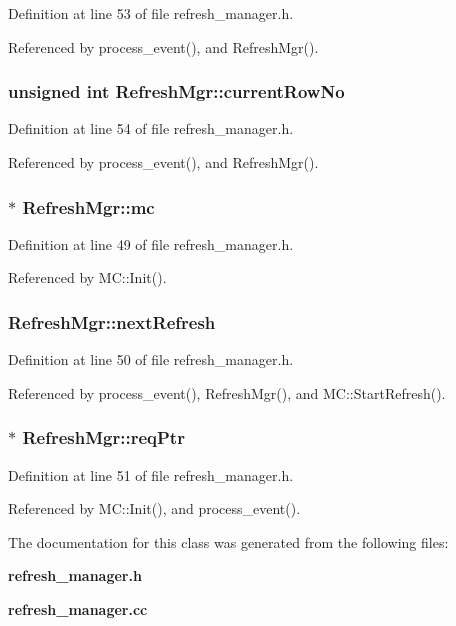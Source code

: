 Definition at line 53 of file refresh\_\-manager.h.

Referenced by process\_\-event(), and RefreshMgr().
\subsubsection[{currentRowNo}]{\setlength{\rightskip}{0pt plus 5cm}unsigned int {\bf RefreshMgr::currentRowNo}}\label{classRefreshMgr_d52556a29b0438070616d85fed03a58f}




Definition at line 54 of file refresh\_\-manager.h.

Referenced by process\_\-event(), and RefreshMgr().
\subsubsection[{mc}]{$\ast$ {\bf RefreshMgr::mc}}\label{classRefreshMgr_5ef603ac3e0216fa892f74bef4c736a3}




Definition at line 49 of file refresh\_\-manager.h.

Referenced by MC::Init().
\subsubsection[{nextRefresh}]{ {\bf RefreshMgr::nextRefresh}}\label{classRefreshMgr_ea259f790c8c353f3c61c3d56a5ecc9a}




Definition at line 50 of file refresh\_\-manager.h.

Referenced by process\_\-event(), RefreshMgr(), and MC::StartRefresh().
\subsubsection[{reqPtr}]{$\ast$ {\bf RefreshMgr::reqPtr}}\label{classRefreshMgr_59369708c3b99c76377847da760d635f}




Definition at line 51 of file refresh\_\-manager.h.

Referenced by MC::Init(), and process\_\-event().

The documentation for this class was generated from the following files:\begin{CompactItemize}
\item 
{\bf refresh\_\-manager.h}\item 
{\bf refresh\_\-manager.cc}\end{CompactItemize}
